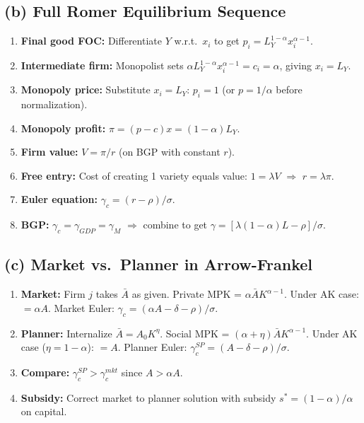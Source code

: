 \documentclass[a4paper,11pt]{article}
\begin{document}
\subsection*{(b) Full Romer Equilibrium Sequence}

\begin{enumerate}
    \item \textbf{Final good FOC:} Differentiate $Y$ w.r.t.\ $x_i$ to get $p_i = L_Y^{1-\alpha} x_i^{\alpha-1}$.
    \item \textbf{Intermediate firm:} Monopolist sets $\alpha L_Y^{1-\alpha} x_i^{\alpha-1} = c_i = \alpha$, giving $x_i = L_Y$.
    \item \textbf{Monopoly price:} Substitute $x_i = L_Y$: $p_i = 1$ (or $p = 1/\alpha$ before normalization).
    \item \textbf{Monopoly profit:} $\pi = (p - c)x = (1 - \alpha)L_Y$.
    \item \textbf{Firm value:} $V = \pi/r$ (on BGP with constant $r$).
    \item \textbf{Free entry:} Cost of creating 1 variety equals value: $1 = \lambda V$ $\Rightarrow$ $r = \lambda \pi$.
    \item \textbf{Euler equation:} $\gamma_c = (r - \rho)/\sigma$.
    \item \textbf{BGP:} $\gamma_c = \gamma_{GDP} = \gamma_M$ $\Rightarrow$ combine to get $\gamma = [\lambda(1-\alpha)L - \rho]/\sigma$.
\end{enumerate}

\subsection*{(c) Market vs.\ Planner in Arrow-Frankel}

\begin{enumerate}
    \item \textbf{Market:} Firm $j$ takes $\bar{A}$ as given. Private MPK = $\alpha \bar{A} K^{\alpha-1}$. Under AK case: $= \alpha A$. Market Euler: $\gamma_c = (\alpha A - \delta - \rho)/\sigma$.
    \item \textbf{Planner:} Internalize $\bar{A} = A_0 K^\eta$. Social MPK = $(\alpha + \eta)\bar{A} K^{\alpha - 1}$. Under AK case ($\eta = 1 - \alpha$): $= A$. Planner Euler: $\gamma_c^{SP} = (A - \delta - \rho)/\sigma$.
    \item \textbf{Compare:} $\gamma_c^{SP} > \gamma_c^{mkt}$ since $A > \alpha A$.
    \item \textbf{Subsidy:} Correct market to planner solution with subsidy $s^* = (1-\alpha)/\alpha$ on capital.
\end{enumerate}
\end{document}
